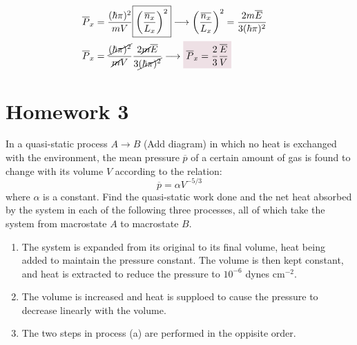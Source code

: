 \documentclass{article}
\begin{document}
\begin{problem}[Reif 2.7]
\begin{enumerate}[label=\alph*)]
\begin{align*}
                \\
                \overline{P}_x&=\frac{(\hbar\pi)^2}{mV}\boxed{\qty(\frac{\overline{n_x}}{L_x})^2}\longrightarrow \qty(\frac{\overline{n_x}}{L_x})^2=\frac{2m\overline{E}}{3(\hbar\pi)^2}
                \\
                \overline{P}_x&=\frac{\cancel{(\hbar\pi)^2}}{\cancel{m}V}\frac{2\cancel{m}\overline{E}}{3\cancel{(\hbar\pi)^2}}\longrightarrow\coloredanswer{\overline{P}_x=\frac{2}{3}\frac{\overline{E}}{V}}
            \end{align*}
        \end{enumerate}
    \end{problem}\newpage
\section{Homework 3}
    \begin{problem}[Reif 2.11]
        In a quasi-static process $A\rightarrow B$ (Add diagram) in which no heat is exchanged with the environment, the mean pressure $\overline{p}$ of a certain amount of gas is found to change with its volume $V$ according to the relation: $$\overline{p}=\alpha V^{-5/3}$$ where $\alpha$ is a constant. Find the quasi-static work done and the net heat absorbed by the system in each of the following three processes, all of which take the system from macrostate $A$ to macrostate $B$. 
        \begin{enumerate}[label=(\alph*)]
            \item The system is expanded from its original to its final volume, heat being added to maintain the pressure constant. The volume is then kept constant, and heat is extracted to reduce the pressure to $10^{-6}$ dynes cm$^{-2}$.
            \item The volume is increased and heat is supploed to cause the pressure to decrease linearly with the volume. 
            \item The two steps in process (a) are performed in the oppisite order. 
        \end{enumerate}
        \answerline
    \end{problem}\newpage
\end{document}
